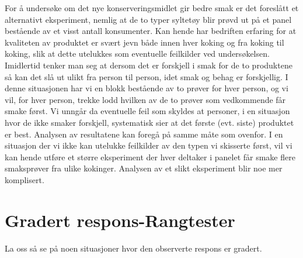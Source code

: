 For å undersøke om det nye konserveringsmidlet gir bedre smak
er det foreslått et alternativt eksperiment, nemlig at de to typer
syltetøy blir prøvd ut på et panel bestående av et visst
antall konsumenter.  Kan hende har bedriften erfaring for at kvaliteten
av produktet er svært jevn både innen hver koking og fra 
koking til koking, slik at dette utelukkes som eventuelle feilkilder
ved undersøkelsen.  Imidlertid tenker man seg at dersom det er forskjell
i smak for de to produktene så kan det slå ut ulikt fra person
til person, idet smak og behag er forskjellig.  I denne situasjonen har
vi en blokk bestående av to prøver for hver person, og vi vil,
for hver person, trekke lodd hvilken av de to prøver som vedkommende
får smake først.  Vi unngår da eventuelle feil som skyldes
at personer, i en situasjon hvor de ikke smaker forskjell, systematisk
sier at det første (evt. siste) produktet er best.  Analysen av
resultatene kan foregå på samme måte som ovenfor.  I en
situasjon der vi ikke kan utelukke feilkilder av den typen vi skisserte
først, vil vi kan hende utføre et større eksperiment der hver 
deltaker i pa\-ne\-let får smake flere smaksprøver fra ulike kokinger.
Analysen av et slikt eksperiment blir noe mer komplisert.


\section{Gradert respons-Rangtester}
La oss så se på noen situasjoner hvor den observerte respons
er gradert.\\

